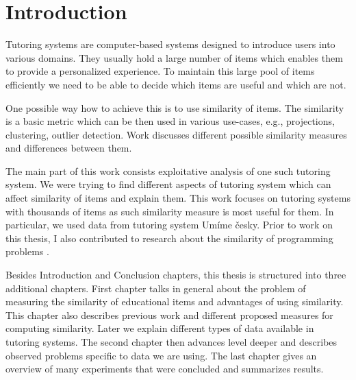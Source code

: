 \documentclass[
  digital, %
  table,   %
  nolof,     %
  nolot,     %
  nocover,
  color,
  final, %
]{fithesis3}
\begin{document}
\newcommand{\ppl}[1]{\textcolor[rgb]{0.6,0.2,1.0}{#1}}
\newcommand{\umimeCesky}{Umíme česky}




\chapter*{Introduction}


Tutoring systems are computer-based systems designed to introduce users into various domains. They usually hold a large number of items which enables them to provide a personalized experience. To maintain this large pool of items efficiently we need to be able to decide which items are useful and which are not.


One possible way how to achieve this is to use similarity of items. The similarity is a basic metric which can be then used in various use-cases, e.g., projections, clustering, outlier detection. Work discusses different possible similarity measures and differences between them.


The main part of this work consists exploitative analysis of one such tutoring system. We were trying to find different aspects of tutoring system which can affect similarity of items and explain them. This work focuses on tutoring systems with thousands of items as such similarity measure is most useful for them. In particular, we used data from tutoring system \umimeCesky{}. Prior to work on this thesis, I also contributed to research about the similarity of programming problems \cite{pelanek2018programming}.


Besides Introduction and Conclusion chapters, this thesis is structured into three additional chapters. First chapter talks in general about the problem of measuring the similarity of educational items and advantages of using similarity. This chapter also describes previous work and different proposed measures for computing similarity. Later we explain different types of data available in tutoring systems. The second chapter then advances level deeper and describes observed problems specific to data we are using.
The last chapter gives an overview of many experiments that were concluded and summarizes results.
\end{document}
